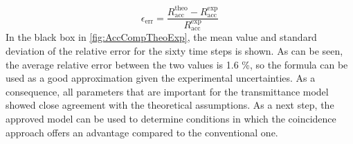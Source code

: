 \begin{equation}
	\epsilon_{\text{err}} = \frac{R_{\text{acc}}^{\text{theo}}-R_{\text{acc}}^{\text{exp}}}{R_{\text{acc}}^{\text{exp}}}
\end{equation}
In the black box in \autoref{fig:AccCompTheoExp}, the mean value and standard deviation of the relative error for the sixty time steps is shown. As can be seen, the average relative error between the two values is 1.6 \%, so the formula can be used as a good approximation given the experimental uncertainties. \newline \newline
As a consequence, all parameters that are important for the transmittance model showed close agreement with the theoretical assumptions. As a next step, the approved model can be used to determine conditions in which the coincidence approach offers an advantage compared to the conventional one. 
